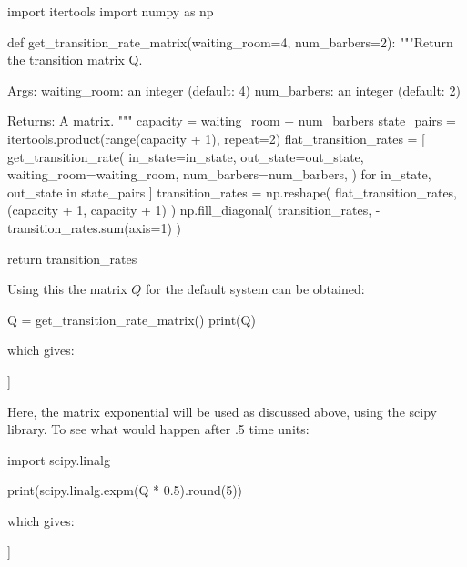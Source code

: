 \begin{pyin}
import itertools
import numpy as np


def get_transition_rate_matrix(waiting_room=4, num_barbers=2):
    """Return the transition matrix Q.

    Args:
        waiting_room: an integer (default: 4)
        num_barbers: an integer (default: 2)

    Returns:
        A matrix.
    """
    capacity = waiting_room + num_barbers
    state_pairs = itertools.product(range(capacity + 1), repeat=2)
    flat_transition_rates = [
        get_transition_rate(
            in_state=in_state,
            out_state=out_state,
            waiting_room=waiting_room,
            num_barbers=num_barbers,
        )
        for in_state, out_state in state_pairs
    ]
    transition_rates = np.reshape(
        flat_transition_rates, (capacity + 1, capacity + 1)
    )
    np.fill_diagonal(
        transition_rates, -transition_rates.sum(axis=1)
    )

    return transition_rates
\end{pyin}

Using this the matrix \(Q\) for the default system can be obtained:

\begin{pyin}
Q = get_transition_rate_matrix()
print(Q)
\end{pyin}

which gives:

\begin{pyout}
[[-10  10   0   0   0   0   0]
 [  4 -14  10   0   0   0   0]
 [  0   8 -18  10   0   0   0]
 [  0   0   8 -18  10   0   0]
 [  0   0   0   8 -18  10   0]
 [  0   0   0   0   8 -18  10]
 [  0   0   0   0   0   8  -8]]
\end{pyout}

Here, the matrix exponential will be used as
discussed above, using the scipy
library. To see what would happen after .5 time units:

\begin{pyin}
import scipy.linalg

print(scipy.linalg.expm(Q * 0.5).round(5))
\end{pyin}

which gives:

\begin{pyout}
[[0.10492 0.21254 0.20377 0.17142 0.13021 0.09564 0.0815 ]
 [0.08501 0.18292 0.18666 0.1708  0.14377 0.1189  0.11194]
 [0.06521 0.14933 0.16338 0.16478 0.15633 0.14751 0.15346]
 [0.04388 0.10931 0.13183 0.15181 0.16777 0.18398 0.21142]
 [0.02667 0.07361 0.10005 0.13422 0.17393 0.2189  0.27262]
 [0.01567 0.0487  0.07552 0.11775 0.17512 0.24484 0.32239]
 [0.01068 0.03668 0.06286 0.10824 0.17448 0.25791 0.34914]]
\end{pyout}

